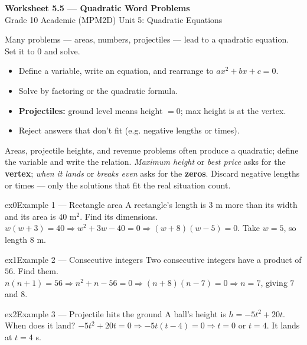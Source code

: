 \documentclass[11pt]{article}
\begin{document}
\begin{center}
{\LARGE\bfseries\color{titleblue}Worksheet 5.5 --- Quadratic Word Problems}\\[2pt]
{\small Grade 10 Academic (MPM2D) \textperiodcentered{} Unit 5: Quadratic Equations}
\end{center}

\begin{ideabox}
Many problems --- areas, numbers, projectiles --- lead to a quadratic equation. Set it to $0$ and solve.
\begin{itemize}[leftmargin=*,itemsep=2pt]
  \item Define a variable, write an equation, and rearrange to $ax^2+bx+c=0$.
  \item Solve by factoring or the quadratic formula.
  \item \textbf{Projectiles:} ground level means height $=0$; max height is at the vertex.
  \item Reject answers that don't fit (e.g. negative lengths or times).
\end{itemize}
\end{ideabox}

\begin{learnbox}
Areas, projectile heights, and revenue problems often produce a quadratic; define the variable and write the relation.
\emph{Maximum height} or \emph{best price} asks for the \textbf{vertex}; \emph{when it lands} or \emph{breaks even} asks for the \textbf{zeros}.
Discard negative lengths or times — only the solutions that fit the real situation count.
\end{learnbox}


\begin{example}{ex0}{Example 1 --- Rectangle area}
A rectangle's length is $3$ m more than its width and its area is $40$ m$^2$. Find its dimensions.
\soln $w(w+3)=40\Rightarrow w^2+3w-40=0\Rightarrow (w+8)(w-5)=0$. Take $w=5$, so length $8$ m.
\end{example}

\begin{example}{ex1}{Example 2 --- Consecutive integers}
Two consecutive integers have a product of $56$. Find them.
\soln $n(n+1)=56\Rightarrow n^2+n-56=0\Rightarrow (n+8)(n-7)=0\Rightarrow n=7$, giving $7$ and $8$.
\end{example}

\begin{example}{ex2}{Example 3 --- Projectile hits the ground}
A ball's height is $h=-5t^2+20t$. When does it land?
\soln $-5t^2+20t=0\Rightarrow -5t(t-4)=0\Rightarrow t=0$ or $t=4$. It lands at $t=4$ s.
\end{example}
\end{document}
